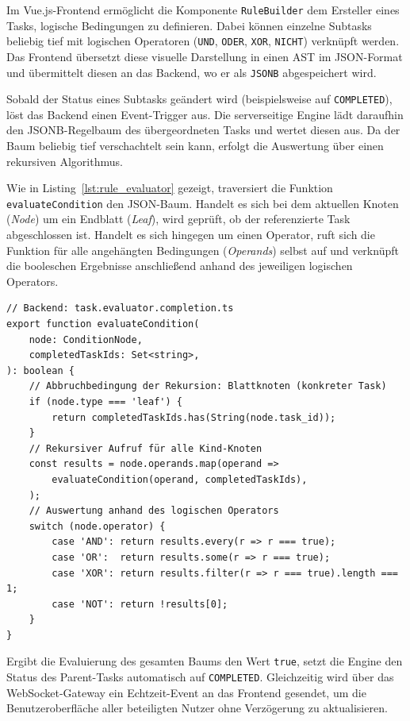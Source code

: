 Im Vue.js-Frontend ermöglicht die Komponente \texttt{RuleBuilder} dem Ersteller eines Tasks, logische Bedingungen zu definieren. Dabei können einzelne Subtasks beliebig tief mit logischen Operatoren (\texttt{UND}, \texttt{ODER}, \texttt{XOR}, \texttt{NICHT}) verknüpft werden. Das Frontend übersetzt diese visuelle Darstellung in einen 
\gls{AST} im JSON-Format und übermittelt diesen an das Backend, wo er als \texttt{JSONB}\cite{postgresql_jsonb} abgespeichert wird.

Sobald der Status eines Subtasks geändert wird (beispielsweise auf \texttt{COMPLETED}), löst das Backend einen Event-Trigger aus. Die serverseitige Engine lädt daraufhin den JSONB-Regelbaum des übergeordneten Tasks und wertet diesen aus. Da der Baum beliebig tief verschachtelt sein kann, erfolgt die Auswertung über einen rekursiven Algorithmus.

Wie in Listing~\ref{lst:rule_evaluator} gezeigt, traversiert die Funktion \texttt{evaluateCondition} den JSON-Baum. Handelt es sich bei dem aktuellen Knoten (\textit{Node}) um ein Endblatt (\textit{Leaf}), wird geprüft, ob der referenzierte Task abgeschlossen ist. Handelt es sich hingegen um einen Operator, ruft sich die Funktion für alle angehängten Bedingungen (\textit{Operands}) selbst auf und verknüpft die booleschen Ergebnisse anschließend anhand des jeweiligen logischen Operators.

\begin{listing}[H]
\begin{verbatim}
// Backend: task.evaluator.completion.ts
export function evaluateCondition(
    node: ConditionNode,
    completedTaskIds: Set<string>,
): boolean {
    // Abbruchbedingung der Rekursion: Blattknoten (konkreter Task)
    if (node.type === 'leaf') {
        return completedTaskIds.has(String(node.task_id));
    }
    // Rekursiver Aufruf für alle Kind-Knoten
    const results = node.operands.map(operand =>
        evaluateCondition(operand, completedTaskIds),
    );
    // Auswertung anhand des logischen Operators
    switch (node.operator) {
        case 'AND': return results.every(r => r === true);
        case 'OR':  return results.some(r => r === true);
        case 'XOR': return results.filter(r => r === true).length === 1;
        case 'NOT': return !results[0];
    }
}
\end{verbatim}
\caption{Rekursive Auswertung des JSONB-Baums zur Task-Validierung}
\label{lst:rule_evaluator}
\end{listing}

Ergibt die Evaluierung des gesamten Baums den Wert \texttt{true}, setzt die Engine den Status des Parent-Tasks automatisch auf \texttt{COMPLETED}. Gleichzeitig wird über das WebSocket-Gateway ein Echtzeit-Event an das Frontend gesendet, um die Benutzeroberfläche aller beteiligten Nutzer ohne Verzögerung zu aktualisieren.

